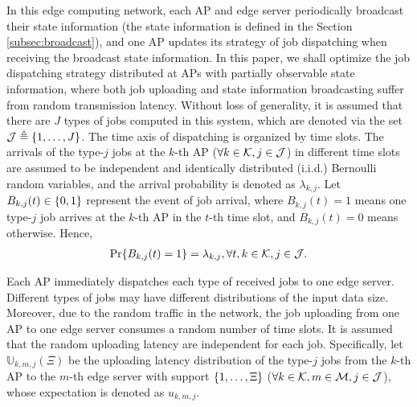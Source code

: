 In this edge computing network, each AP and edge server periodically broadcast their state information (the state information is defined in the Section \ref{subsec:broadcast}), and one AP updates its strategy of job dispatching when receiving the broadcast state information.
In this paper, we shall optimize the job dispatching strategy distributed at APs with partially observable state information, where both job uploading and state information broadcasting suffer from random transmission latency.
Without loss of generality, it is assumed that there are $J$ types of jobs computed in this system, which are denoted via the set $\mathcal{J} \triangleq \{1,\dots,J\}$.
The time axis of dispatching is organized by time slots.
The arrivals of the type-$j$ jobs at the $k$-th AP ($\forall k\in\mathcal{K},j\in\mathcal{J}$) in different time slots are assumed to be independent and identically distributed (i.i.d.) Bernoulli random variables, and the arrival probability is denoted as $\lambda_{k,j}$.
Let $B_{k,j}(t) \in \{0,1\}$ represent the event of job arrival, where $B_{k,j}(t)=1$ means one type-$j$ job arrives at the $k$-th AP in the $t$-th time slot, and $B_{k,j}(t)=0$ means otherwise.
Hence,
\begin{align}
    \Pr\{ B_{k,j}(t) = 1 \} = \lambda_{k,j}, \forall t,k\in\mathcal{K},j\in\mathcal{J}.
\end{align}

Each AP immediately dispatches each type of received jobs to one edge server.
Different types of jobs may have different distributions of the input data size.
Moreover, due to the random traffic in the network, the job uploading from one AP to one edge server consumes a random number of time slots.
It is assumed that the random uploading latency are independent for each job.
Specifically, let $\mathbb{U}_{k,m,j}(\Xi)$ be the uploading latency distribution of the type-$j$ jobs from the $k$-th AP to the $m$-th edge server with support $\{1, \dots, \Xi\}$ ($\forall k\in\mathcal{K}, m\in\mathcal{M}, j\in\mathcal{J}$), whose expectation is denoted as $u_{k,m,j}$.

